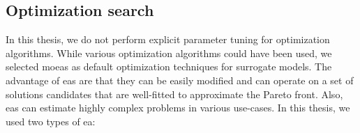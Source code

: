         \begin{table}[]
            \centering
            \caption{Selected multi-objective test problems}
            \label{tab:bench_problems}
        \end{table}


    \subsection{Optimization search}
    In this thesis, we do not perform explicit parameter tuning for optimization algorithms. While various optimization algorithms could have been used, we selected \glspl{moea} as default optimization techniques for surrogate models. The advantage of \gls{ea}s are that they can be easily modified and can operate on a set of solutions candidates that are well-fitted to approximate the Pareto front. Also, \glspl{ea} can estimate highly complex problems in various use-cases. In this thesis, we used two types of \gls{ea}:

